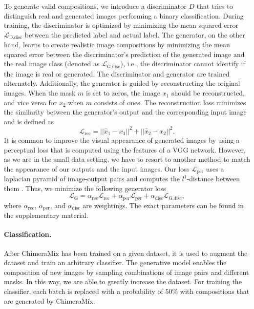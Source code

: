 \documentclass{article}
\newcommand{\methodname}{ChimeraMix\xspace}
\begin{document}
To generate valid compositions, we introduce a discriminator $D$ that tries to distinguish real and generated images performing a binary classification.
During training, the discriminator is optimized by minimizing the mean squared error $\mathcal{L}_{\text{D,disc}}$ between the predicted label and actual label.
The generator, on the other hand, learns to create realistic image compositions by minimizing the mean squared error between the discriminator's prediction of the generated image and the real image class (denoted as $\mathcal{L}_{\text{G,disc}}$), i.e., the discriminator cannot identify if the image is real or generated. 
The discriminator and generator are trained alternately.
Additionally, the generator is guided by reconstructing the original images. 
When the mask $m$ is set to zeros, the image $x_1$ should be reconstructed, and vice versa for $x_2$ when $m$ consists of ones. 
The reconstruction loss minimizes the similarity between the generator's output and the corresponding input image and is defined as 
\begin{equation}
    \mathcal{L}_{\text{rec}} = ||\hat{x}_1 - x_1||^2 + ||\hat{x}_2 - x_2||^2.
\end{equation}
It is common to improve the visual appearance of generated images by using a perceptual loss that is computed using the features of a VGG \cite{simonyanVeryDeepConvolutional2015} network.
However, as we are in the small data setting, we have to resort to another method to match the appearance of our outputs and the input images.
Our loss $\mathcal{L}_{\text{per}}$ uses a laplacian pyramid of image-output pairs and computes the $l^1$-distance between them \cite{dentonDeepGenerativeImage2015}.
Thus, we minimize the following generator loss 
\begin{equation}
    \mathcal{L}_{\text{G}} = \alpha_{\text{rec}} \mathcal{L}_{\text{rec}} + \alpha_{\text{per}} \mathcal{L}_{\text{per}} + \alpha_{\text{disc}} \mathcal{L}_{\text{G,disc}},
    \label{eq:loss}
\end{equation}
where $\alpha_{\text{rec}}$, $\alpha_{\text{per}}$, and $\alpha_{\text{disc}}$ are weightings.
The exact parameters can be found in the supplementary material. 


\paragraph{Classification.}
\label{par:classifier}

After \methodname has been trained on a given dataset, it is used to augment the dataset and train an arbitrary classifier. 
The generative model enables the composition of new images by sampling combinations of image pairs and different masks. 
In this way, we are able to greatly increase the dataset. 
For training the classifier, each batch is replaced with a probability of $50\%$ with compositions that are generated by \methodname.
\end{document}
